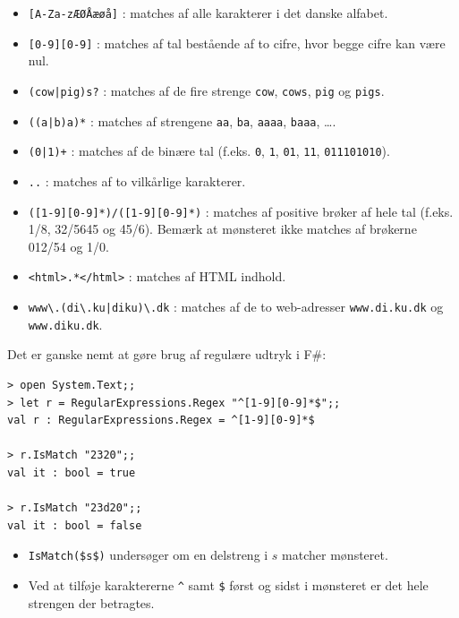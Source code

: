 \documentclass[rgb]{beamer}
\begin{document}
\begin{frame}[fragile]
\begin{footnotesize}

\begin{itemize}
\item \texttt{[A-Za-zÆØÅæøå]} : matches af alle karakterer i det danske
  alfabet.
\item \texttt{[0-9][0-9]} : matches af tal bestående af to cifre,
  hvor begge cifre kan være nul.
\item \texttt{(cow|pig)s?} : matches af de fire strenge \texttt{cow},
  \texttt{cows}, \texttt{pig} og \texttt{pigs}.
\item \texttt{((a|b)a)*} : matches af strengene \texttt{aa}, \texttt{ba},
  \texttt{aaaa}, \texttt{baaa}, \ldots.
\item \texttt{(0|1)+} : matches af de binære tal (f.eks. \texttt{0},
  \texttt{1}, \texttt{01}, \texttt{11}, \texttt{011101010}).
\item \texttt{..} : matches af to vilkårlige karakterer.
\item \texttt{([1-9][0-9]*)/([1-9][0-9]*)} : matches af positive
  brøker af hele tal (f.eks. 1/8, 32/5645 og 45/6). Bemærk at
  mønsteret ikke matches af brøkerne 012/54 og 1/0.
\item \texttt{<html>.*</html>} : matches af HTML indhold.
\item \texttt{www}\verb+\+\texttt{.(di}\verb+\+\texttt{.ku|diku)}\verb+\+\texttt{.dk}
  : matches af de to web-adresser \texttt{www.di.ku.dk} og
  \texttt{www.diku.dk}.
\end{itemize}

\end{footnotesize}
\end{frame}

\begin{frame}[fragile]
\begin{footnotesize}

  Det er ganske nemt at gøre brug af regulære udtryk i F\#:

  \vspace{1ex}

\begin{lstlisting}[numbers=none,frame=none]
> open System.Text;;
> let r = RegularExpressions.Regex "^[1-9][0-9]*$";;
val r : RegularExpressions.Regex = ^[1-9][0-9]*$

> r.IsMatch "2320";;
val it : bool = true

> r.IsMatch "23d20";;
val it : bool = false
\end{lstlisting}

\begin{itemize}
\item \lstinline[mathescape]{IsMatch($s$)} undersøger om en delstreng i $s$ matcher mønsteret.
\item Ved at tilføje karaktererne \verb+^+ samt \verb+$+ først og
  sidst i mønsteret er det hele strengen der betragtes.
\end{itemize}
\end{footnotesize}
\end{frame}
\end{document}
